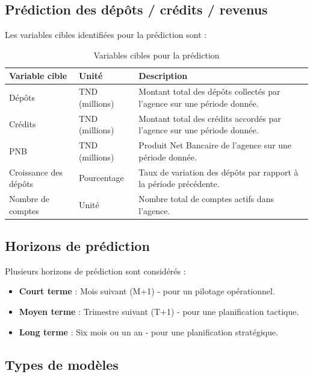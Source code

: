 \subsection{Prédiction des dépôts / crédits / revenus}

Les variables cibles identifiées pour la prédiction sont :

\begin{table}[H]
\centering
\begin{tabular}{|p{3cm}|p{4.5cm}|p{6cm}|}
\hline
\textbf{Variable cible} & \textbf{Unité} & \textbf{Description} \\
\hline
Dépôts & TND (millions) & Montant total des dépôts collectés par l'agence sur une période donnée. \\
\hline
Crédits & TND (millions) & Montant total des crédits accordés par l'agence sur une période donnée. \\
\hline
PNB & TND (millions) & Produit Net Bancaire de l'agence sur une période donnée. \\
\hline
Croissance des dépôts & Pourcentage & Taux de variation des dépôts par rapport à la période précédente. \\
\hline
Nombre de comptes & Unité & Nombre total de comptes actifs dans l'agence. \\
\hline
\end{tabular}
\caption{Variables cibles pour la prédiction}
\label{tab:target-variables}
\end{table}

\subsection{Horizons de prédiction}

Plusieurs horizons de prédiction sont considérés :

\begin{itemize}
    \item \textbf{Court terme} : Mois suivant (M+1) - pour un pilotage opérationnel.
    \item \textbf{Moyen terme} : Trimestre suivant (T+1) - pour une planification tactique.
    \item \textbf{Long terme} : Six mois ou un an - pour une planification stratégique.
\end{itemize}

\subsection{Types de modèles}

